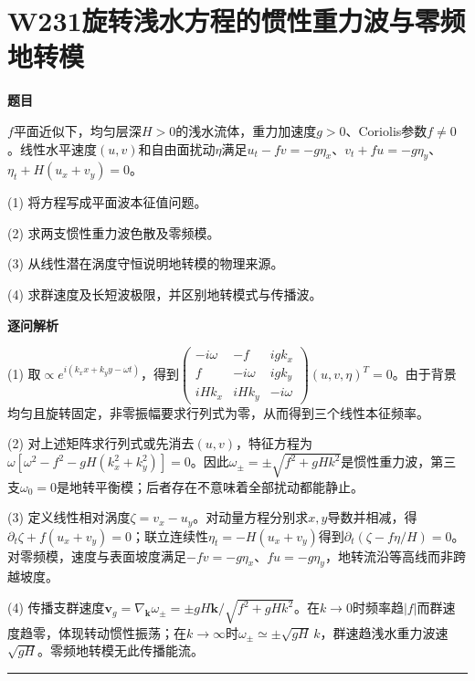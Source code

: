 \documentclass[UTF8,a4paper,11pt,oneside,openany]{ctexbook}
\begin{document}
\section*{W231\quad 旋转浅水方程的惯性重力波与零频地转模}
\textbf{题目}\par
$f$平面近似下，均匀层深$H>0$的浅水流体，重力加速度$g>0$、Coriolis参数$f\ne0$。线性水平速度$(u,v)$和自由面扰动$\eta$满足$u_t-fv=-g\eta_x$、$v_t+fu=-g\eta_y$、$\eta_t+H(u_x+v_y)=0$。
\par\smallskip\noindent (1) 将方程写成平面波本征值问题。
\par\smallskip\noindent (2) 求两支惯性重力波色散及零频模。
\par\smallskip\noindent (3) 从线性潜在涡度守恒说明地转模的物理来源。
\par\smallskip\noindent (4) 求群速度及长短波极限，并区别地转模式与传播波。
\par\medskip\textbf{逐问解析}\par
\par\smallskip\noindent (1) 取$\propto e^{i(k_xx+k_yy-\omega t)}$，得到$\begin{pmatrix}-i\omega&-f&igk_x\\f&-i\omega&igk_y\\iHk_x&iHk_y&-i\omega\end{pmatrix}(u,v,\eta)^T=0$。由于背景均匀且旋转固定，非零振幅要求行列式为零，从而得到三个线性本征频率。
\par\smallskip\noindent (2) 对上述矩阵求行列式或先消去$(u,v)$，特征方程为$\omega[\omega^2-f^2-gH(k_x^2+k_y^2)]=0$。因此$\omega_\pm=\pm\sqrt{f^2+gHk^2}$是惯性重力波，第三支$\omega_0=0$是地转平衡模；后者存在不意味着全部扰动都能静止。
\par\smallskip\noindent (3) 定义线性相对涡度$\zeta=v_x-u_y$。对动量方程分别求$x,y$导数并相减，得$\partial_t\zeta+f(u_x+v_y)=0$；联立连续性$\eta_t=-H(u_x+v_y)$得到$\partial_t(\zeta-f\eta/H)=0$。对零频模，速度与表面坡度满足$-fv=-g\eta_x$、$fu=-g\eta_y$，地转流沿等高线而非跨越坡度。
\par\smallskip\noindent (4) 传播支群速度$\boldsymbol v_g=\nabla_{\boldsymbol k}\omega_\pm=\pm gH\boldsymbol k/\sqrt{f^2+gHk^2}$。在$k\to0$时频率趋$|f|$而群速度趋零，体现转动惯性振荡；在$k\to\infty$时$\omega_\pm\simeq\pm\sqrt{gH}\,k$，群速趋浅水重力波速$\sqrt{gH}$。零频地转模无此传播能流。
\par\medskip\hrule\medskip
\end{document}
